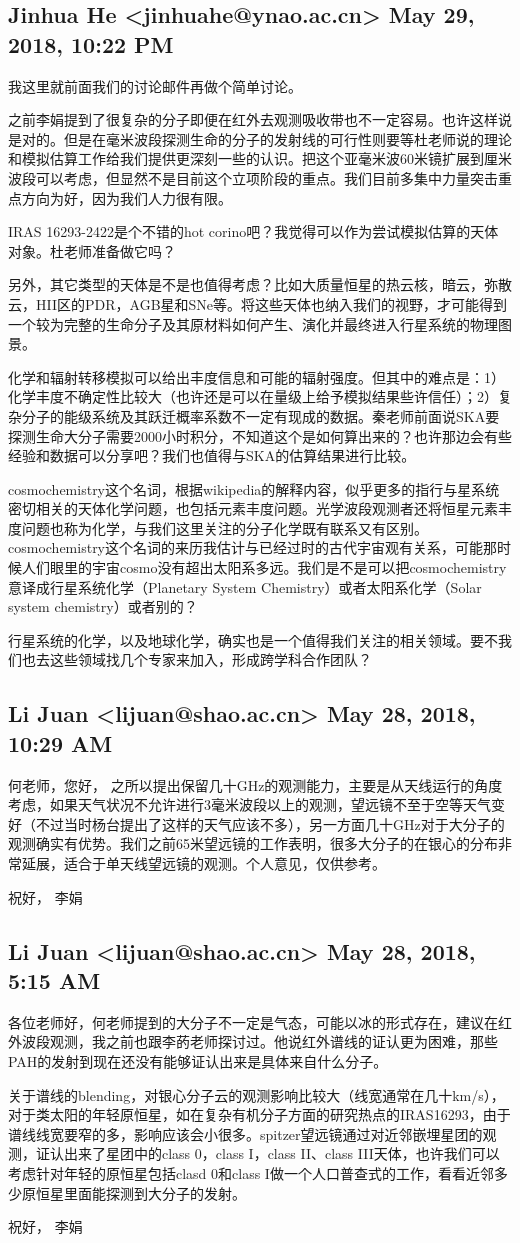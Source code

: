 \documentclass{article}
\newcommand\from[2]{\subsection{{#1} {#2}}}
\newcommand\said[1]{#1}
\begin{document}
\from{
Jinhua He <jinhuahe@ynao.ac.cn>
}{
May 29, 2018, 10:22 PM
}
\said{
我这里就前面我们的讨论邮件再做个简单讨论。

之前李娟提到了很复杂的分子即便在红外去观测吸收带也不一定容易。也许这样说是对的。但是在毫米波段探测生命的分子的发射线的可行性则要等杜老师说的理论和模拟估算工作给我们提供更深刻一些的认识。把这个亚毫米波60米镜扩展到厘米波段可以考虑，但显然不是目前这个立项阶段的重点。我们目前多集中力量突击重点方向为好，因为我们人力很有限。

IRAS 16293-2422是个不错的hot corino吧？我觉得可以作为尝试模拟估算的天体对象。杜老师准备做它吗？

另外，其它类型的天体是不是也值得考虑？比如大质量恒星的热云核，暗云，弥散云，HII区的PDR，AGB星和SNe等。将这些天体也纳入我们的视野，才可能得到一个较为完整的生命分子及其原材料如何产生、演化并最终进入行星系统的物理图景。

化学和辐射转移模拟可以给出丰度信息和可能的辐射强度。但其中的难点是：1）化学丰度不确定性比较大（也许还是可以在量级上给予模拟结果些许信任）；2）复杂分子的能级系统及其跃迁概率系数不一定有现成的数据。秦老师前面说SKA要探测生命大分子需要2000小时积分，不知道这个是如何算出来的？也许那边会有些经验和数据可以分享吧？我们也值得与SKA的估算结果进行比较。

cosmochemistry这个名词，根据wikipedia的解释内容，似乎更多的指行与星系统密切相关的天体化学问题，也包括元素丰度问题。光学波段观测者还将恒星元素丰度问题也称为化学，与我们这里关注的分子化学既有联系又有区别。cosmochemistry这个名词的来历我估计与已经过时的古代宇宙观有关系，可能那时候人们眼里的宇宙cosmo没有超出太阳系多远。我们是不是可以把cosmochemistry意译成行星系统化学（Planetary System Chemistry）或者太阳系化学（Solar system chemistry）或者别的？

行星系统的化学，以及地球化学，确实也是一个值得我们关注的相关领域。要不我们也去这些领域找几个专家来加入，形成跨学科合作团队？
}

\from{
Li Juan <lijuan@shao.ac.cn>
}{
May 28, 2018, 10:29 AM
}
\said{
何老师，您好，
         之所以提出保留几十GHz的观测能力，主要是从天线运行的角度考虑，如果天气状况不允许进行3毫米波段以上的观测，望远镜不至于空等天气变好（不过当时杨台提出了这样的天气应该不多），另一方面几十GHz对于大分子的观测确实有优势。我们之前65米望远镜的工作表明，很多大分子的在银心的分布非常延展，适合于单天线望远镜的观测。个人意见，仅供参考。

祝好，
李娟
}

\from{
Li Juan <lijuan@shao.ac.cn>
}{
May 28, 2018, 5:15 AM
}
\said{
各位老师好，何老师提到的大分子不一定是气态，可能以冰的形式存在，建议在红外波段观测，我之前也跟李菂老师探讨过。他说红外谱线的证认更为困难，那些PAH的发射到现在还没有能够证认出来是具体来自什么分子。

关于谱线的blending，对银心分子云的观测影响比较大（线宽通常在几十km/s），对于类太阳的年轻原恒星，如在复杂有机分子方面的研究热点的IRAS16293，由于谱线线宽要窄的多，影响应该会小很多。spitzer望远镜通过对近邻嵌埋星团的观测，证认出来了星团中的class 0，class I，class II、class III天体，也许我们可以考虑针对年轻的原恒星包括clasd 0和class I做一个人口普查式的工作，看看近邻多少原恒星里面能探测到大分子的发射。

祝好，
李娟
}
\end{document}
